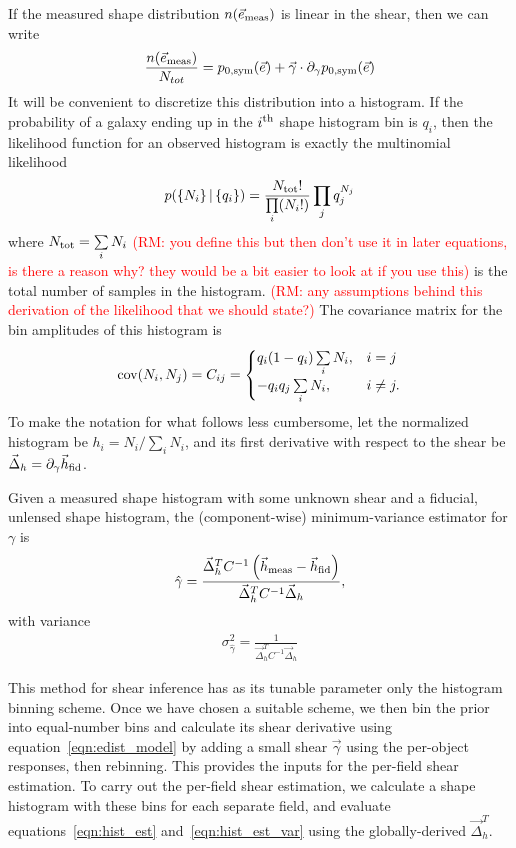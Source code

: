 \documentclass[iop]{emulateapj}
\newcommand\rmcomment[1]{\textcolor{red}{(RM: #1)}}
\begin{document}
If the measured shape distribution $n(\vec{e}_{\rm meas})$ is linear
in the shear, then we can write
\begin{align}
\frac{n(\vec{e}_{\rm meas})}{N_{tot}} = p_{0,\rm sym}(\vec{e}) + \vec{\gamma}\cdot \partial_{\gamma} p_{0,\rm sym}(\vec{e})
\end{align}
It will be convenient to discretize this distribution into a
histogram. If the probability of a galaxy ending up in the $i^{\rm
  th}$ shape histogram bin is $q_i$, then the likelihood function for
an observed histogram is exactly the multinomial likelihood
\begin{align}
p( \left\{N_i\right\} |\left\{ q_i\right\} ) = \frac{N_{\rm tot}!}{\prod\limits_i (N_i!)}\prod\limits_j q_j^{N_j}
\label{eqn:multnomial}
\end{align}
where $N_{\rm tot} = \sum\limits_i N_i$ \rmcomment{you define this but then don't use it in later
  equations, is there a reason why?  they would be a bit easier to look at if you use this}  
is the total number of samples
in the histogram. \rmcomment{any assumptions behind this derivation of the likelihood that we should
  state?} The covariance matrix for the bin amplitudes of
this histogram is
\begin{align}
{\rm cov}(N_i, N_j) = C_{ij} = \begin{cases}
  q_i(1-q_i)\sum\limits_i N_i, & i=j \\
  -q_iq_j \sum\limits_i N_i, & i \neq j.
\end{cases}
\end{align}
To make the notation for what follows less cumbersome, let the
normalized histogram be $h_i = N_i / \sum\limits_i N_i$, and its first
derivative with respect to the shear be
$\vec{\Delta}_h=\partial_{\gamma}\vec{h}_{\rm fid}$.

Given a measured shape histogram with some unknown shear and a
fiducial, unlensed shape histogram, the (component-wise)
minimum-variance estimator for $\gamma$ is
\begin{align}
\hat{\gamma} = \frac{\vec{\Delta}_h^T C^{-1}\left( \vec{h}_{\rm meas} - \vec{h}_{\rm fid}\right)} {\vec{\Delta}_h^TC^{-1}\vec{\Delta}_h},
\label{eqn:hist_est}
\end{align}
with variance 
\begin{align}
\sigma^2_{\hat{\gamma}} = \frac{1}{\vec{\Delta}_h^TC^{-1}\vec{\Delta}_h}
\label{eqn:hist_est_var}
\end{align}

This method for shear inference has as its tunable parameter only the
histogram binning scheme. Once we have chosen a suitable scheme, we then
bin the prior into equal-number bins and calculate its shear
derivative using equation~\ref{eqn:edist_model} by adding  a
  small shear $\vec{\gamma}$ using the per-object responses, then rebinning. This provides the
  inputs for the per-field shear estimation.  To carry out the per-field shear estimation, we calculate a shape
histogram with these bins for each separate field, and evaluate
equations~\ref{eqn:hist_est} and~\ref{eqn:hist_est_var} using the globally-derived $\vec{\Delta}_h^T$.
\end{document}
